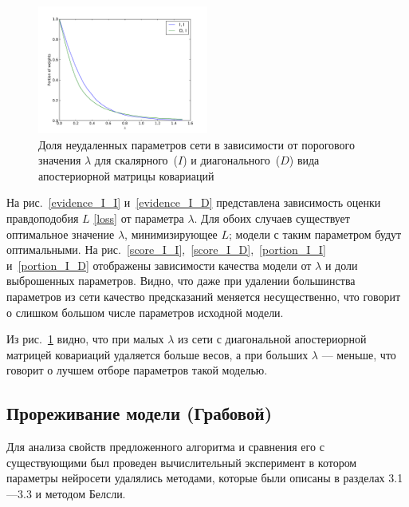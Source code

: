 \begin{figure}[!h]
	\centering
	\includegraphics[width=0.5\textwidth]{plots/smerdov/lambdas.pdf}
	\caption{Доля неудаленных параметров сети в зависимости от порогового значения $\lambda$ для скалярного~($I$) и диагонального~($D$) вида апостериорной матрицы ковариаций}
	\label{lambdas}
\end{figure}

 

На рис.~\ref{evidence_I_I} и~\ref{evidence_I_D} представлена зависимость оценки правдоподобия $L$ \eqref{loss} от параметра $\lambda$.
Для обоих случаев существует оптимальное значение $\lambda$, минимизирующее $L$; модели с таким параметром будут оптимальными. На рис.~\ref{score_I_I},~\ref{score_I_D},~\ref{portion_I_I} и~\ref{portion_I_D} отображены зависимости качества модели от $\lambda$ и доли выброшенных параметров. Видно, что даже при удалении большинства параметров из сети качество предсказаний меняется несущественно, что говорит о слишком большом числе параметров исходной модели.

Из рис.~\ref{lambdas} видно, что при малых $\lambda$ из сети с диагональной апостериорной матрицей ковариаций удаляется больше весов, а при больших $\lambda$ --- меньше, что говорит о лучшем отборе параметров такой моделью.


\subsection{Прореживание модели (Грабовой)}
Для анализа свойств предложенного алгоритма и сравнения его с существующими был проведен вычислительный эксперимент в котором параметры нейросети удалялись методами,  которые были описаны в разделах 3.1---3.3 и методом Белсли.

